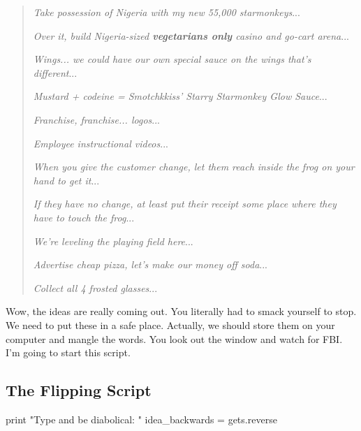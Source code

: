 \documentclass[12pt,twoside]{report}
\begin{document}
\begin{quote}


 {\em Take possession of Nigeria with my new 55,000 starmonkeys}...

 

 {\em Over it, build Nigeria-sized {\bf vegetarians only} casino and
   go-cart arena}...

 

 {\em Wings... we could have our own special sauce on the wings that's
   different}...

 

 {\em Mustard + codeine = Smotchkkiss' Starry Starmonkey Glow
   Sauce}...

 

 {\em Franchise, franchise... logos}...

 

 {\em Employee instructional videos}...

 

 {\em When you give the customer change, let them reach inside the
   frog on your hand to get it}...

 

 {\em If they have no change, at least put their receipt some place
   where they have to touch the frog}...

 

 {\em We're leveling the playing field here}...

 

 {\em Advertise cheap pizza, let's make our money off soda}...

 

 {\em Collect all 4 frosted glasses}...

\end{quote}


Wow, the ideas are really coming out.  You literally had to smack
yourself to stop.  We need to put these in a safe place.  Actually, we
should store them on your computer and mangle the words.  You look out
the window and watch for FBI.  I'm going to start this script.



\subsection{The Flipping Script}




\begin{rubycode}
	
 print "Type and be diabolical: " 
 idea_backwards = gets.reverse

\end{rubycode}
\end{document}
